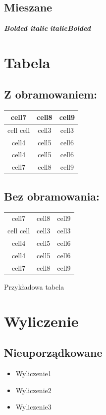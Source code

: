 \documentclass{report}
\begin{document}
        \subsection{Mieszane}
            \textbf{\textit{Bolded italic}}
            \newline
            \textit{\textbf{italicBolded}}

    \section{Tabela}
        \subsection{Z obramowaniem:}
            \begin{tabular}{| c | c | c |}
                \hline
                cell7 & cell8 & cell9\\
                \hline
                cell cell & cell3 & cell3 \\
                \hline
                cell4 & cell5 & cell6 \\
                \hline
                cell4 & cell5 & cell6 \\
                \hline
                cell7 & cell8 & cell9
            \end{tabular}

        \subsection{Bez obramowania:}
        \begin{tabular}{c c c}
            cell7 & cell8 & cell9\\
            cell cell & cell3 & cell3 \\
            cell4 & cell5 & cell6 \\
            cell4 & cell5 & cell6 \\
            cell7 & cell8 & cell9  
        \end{tabular}
        \caption{Przykładowa tabela}
            

    \section{Wyliczenie}
        \subsection{Nieuporządkowane}
            \begin{itemize}
                \item Wyliczenie1
                \item Wyliczenie2
                \item Wyliczenie3
            \end{itemize}
\end{document}
